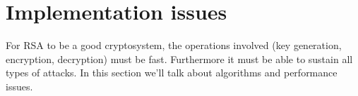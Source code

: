 \section{Implementation issues}

For RSA to be a good cryptosystem, the operations involved (key
generation, encryption, decryption) must be fast. Furthermore it
must be able to sustain all types of attacks. In this section
we'll talk about algorithms and performance issues.
